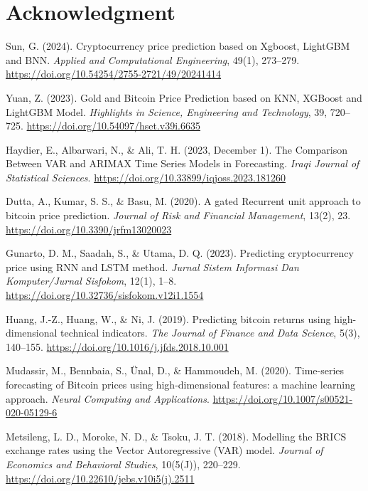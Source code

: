 \documentclass{ieeeojies}
\begin{document}
\section*{Acknowledgment}


\begin{thebibliography}{00}
     Sun, G. (2024). Cryptocurrency price prediction based on Xgboost, LightGBM and BNN. \textit{Applied and Computational Engineering}, 49(1), 273–279. \url{https://doi.org/10.54254/2755-2721/49/20241414}

     Yuan, Z. (2023). Gold and Bitcoin Price Prediction based on KNN, XGBoost and LightGBM Model. \textit{Highlights in Science, Engineering and Technology}, 39, 720–725. \url{https://doi.org/10.54097/hset.v39i.6635}

     Haydier, E., Albarwari, N., \& Ali, T. H. (2023, December 1). The Comparison Between VAR and ARIMAX Time Series Models in Forecasting. \textit{Iraqi Journal of Statistical Sciences}. \url{https://doi.org/10.33899/iqjoss.2023.181260}

     Dutta, A., Kumar, S. S., \& Basu, M. (2020). A gated Recurrent unit approach to bitcoin price prediction. \textit{Journal of Risk and Financial Management}, 13(2), 23. \url{https://doi.org/10.3390/jrfm13020023}

     Gunarto, D. M., Saadah, S., \& Utama, D. Q. (2023). Predicting cryptocurrency price using RNN and LSTM method. \textit{Jurnal Sistem Informasi Dan Komputer/Jurnal Sisfokom}, 12(1), 1–8. \url{https://doi.org/10.32736/sisfokom.v12i1.1554}

     Huang, J.-Z., Huang, W., \& Ni, J. (2019). Predicting bitcoin returns using high-dimensional technical indicators. \textit{The Journal of Finance and Data Science}, 5(3), 140–155. \url{https://doi.org/10.1016/j.jfds.2018.10.001}

     Mudassir, M., Bennbaia, S., Ünal, D., \& Hammoudeh, M. (2020). Time-series forecasting of Bitcoin prices using high-dimensional features: a machine learning approach. \textit{Neural Computing and Applications}. \url{https://doi.org/10.1007/s00521-020-05129-6}

     Metsileng, L. D., Moroke, N. D., \& Tsoku, J. T. (2018). Modelling the BRICS exchange rates using the Vector Autoregressive (VAR) model. \textit{Journal of Economics and Behavioral Studies}, 10(5(J)), 220–229. \url{https://doi.org/10.22610/jebs.v10i5(j).2511}
\end{thebibliography}

\EOD
\end{document}
